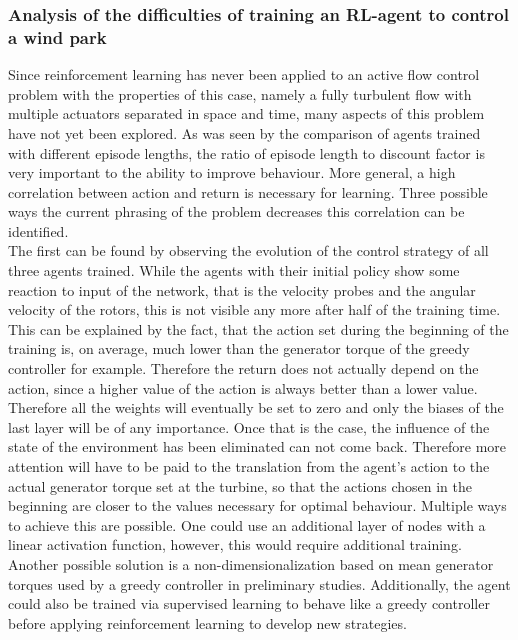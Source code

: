 \subsubsection{Analysis of the difficulties of training an RL-agent to control a wind park}
Since reinforcement learning has never been applied to an active flow control problem with the properties of this case, namely a fully turbulent flow with multiple actuators separated in space and time, many aspects of this problem have not yet been explored.
As was seen by the comparison of agents trained with different episode lengths, the ratio of episode length to discount factor is very important to the ability to improve behaviour. More general, a high correlation between action and return is necessary for learning. Three possible ways the current phrasing of the problem decreases this correlation can be identified.  \\ 
The first can be found by observing the evolution of the control strategy of all three agents trained. While the agents with their initial policy show some reaction to input of the network, that is the velocity probes and the angular velocity of the rotors, this is not visible any more after half of the training time. This can be explained by the fact, that the action set during the beginning of the training is, on average, much lower than the generator torque of the greedy controller for example. Therefore the return does not actually depend on the action, since a higher value of the action is always better than a lower value. Therefore all the weights will eventually be set to zero and only the biases of the last layer will be of any importance. Once that is the case, the influence of the state of the environment has been eliminated can not come back. Therefore more attention will have to be paid to the translation from the agent's action to the actual generator torque set at the turbine, so that the actions chosen in the beginning are closer to the values necessary for optimal behaviour. Multiple ways to achieve this are possible. One could use an additional layer of nodes with a linear activation function, however, this would require additional training. Another possible solution is a non-dimensionalization based on mean generator torques used by a greedy controller in preliminary studies. Additionally, the agent could also be trained via supervised learning to behave like a greedy controller before applying reinforcement learning to develop new strategies.\\
